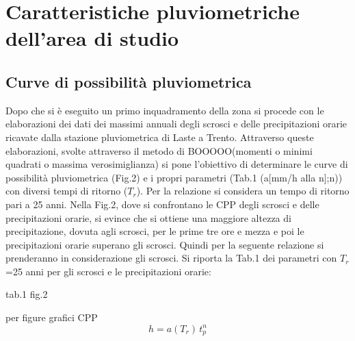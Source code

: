 \chapter{Caratteristiche pluviometriche dell’area di studio}\label{cap:pluviometriche}
\section{Curve di possibilità pluviometrica}
Dopo che si è eseguito un primo inquadramento della zona si procede con le elaborazioni dei dati dei massimi annuali degli scrosci e delle precipitazioni orarie ricavate dalla stazione pluviometrica di Laste a Trento.
Attraverso queste elaborazioni, svolte attraverso il metodo di BOOOOO(momenti o minimi quadrati o massima verosimiglianza) si pone l'obiettivo di determinare le curve di possibilità pluviometrica (Fig.2) e i propri parametri (Tab.1 (a[mm/h alla n];n)) con diversi tempi di ritorno ($T_r$). 
Per la relazione si considera un tempo di ritorno pari a \si{25} anni. Nella Fig.2, dove si confrontano le CPP degli scrosci e delle precipitazioni orarie, si evince che si ottiene una maggiore altezza di precipitazione, dovuta agli scrosci, per le prime tre ore e mezza e poi le precipitazioni orarie superano gli scrosci. 
Quindi per la seguente relazione si prenderanno in considerazione gli scrosci. 
Si riporta la Tab.1 dei parametri con $T_r$=\si{25} anni per gli scrosci e le precipitazioni orarie:

tab.1 fig.2

per figure grafici CPP 
\begin{equation}
    h = a(T_r) \, t_p ^{n}
\end{equation}